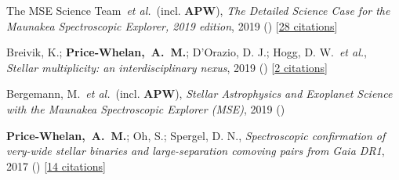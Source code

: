 \item[{\color{deemph}\scriptsize4}]The MSE Science Team~\textit{et al.}~(incl. \textbf{APW}), \textit{The Detailed Science Case for the Maunakea Spectroscopic Explorer, 2019 edition}, 2019 () [\href{http://adsabs.harvard.edu/abs/2019arXiv190404907T}{28 citations}]

\item[{\color{deemph}\scriptsize3}]Breivik, K.; \textbf{Price-Whelan,~A.~M.}; D'Orazio, D. J.; Hogg, D. W.~\textit{et al.}, \textit{Stellar multiplicity: an interdisciplinary nexus}, 2019 () [\href{http://adsabs.harvard.edu/abs/2019arXiv190305094B}{2 citations}]

\item[{\color{deemph}\scriptsize2}]Bergemann, M.~\textit{et al.}~(incl. \textbf{APW}), \textit{Stellar Astrophysics and Exoplanet Science with the Maunakea Spectroscopic Explorer (MSE)}, 2019 ()

\item[{\color{deemph}\scriptsize1}]\textbf{Price-Whelan,~A.~M.}; Oh, S.; Spergel, D. N., \textit{Spectroscopic confirmation of very-wide stellar binaries and large-separation comoving pairs from Gaia DR1}, 2017 () [\href{http://adsabs.harvard.edu/abs/2017arXiv170903532P}{14 citations}]